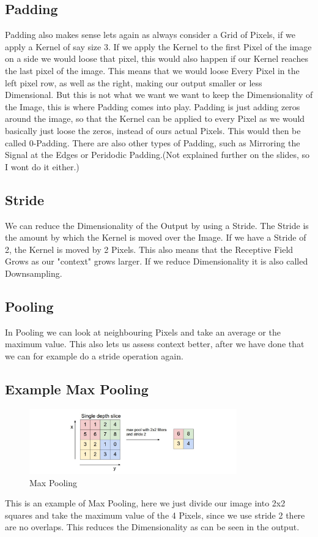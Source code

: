 \documentclass[a4paper]{article}
\begin{document}
\subsection{Padding}
Padding also makes sense lets again as always consider a Grid of Pixels, if we apply a Kernel of say size 3. If we apply the Kernel to the first Pixel of the image on a side we would loose that pixel, this would also happen if our Kernel reaches the last pixel of the image. This means that we would loose Every Pixel in the left pixel row, as well as the right, making our output smaller or less Dimensional. 
But this is not what we want we want to keep the Dimensionality of the Image, this is where Padding comes into play. Padding is just adding zeros around the image, so that the Kernel can be applied to every Pixel as we would basically just loose the zeros, instead of ours actual Pixels. This would then be called 0-Padding. There are also other types of Padding, such as Mirroring the Signal at the Edges or Peridodic Padding.(Not explained further on the slides, so I wont do it either.)

\subsection{Stride}
We can reduce the Dimensionality of the Output by using a Stride. The Stride is the amount by which the Kernel is moved over the Image. If we have a Stride of 2, the Kernel is moved by 2 Pixels. This also means that the Receptive Field Grows as our "context" grows larger. If we reduce Dimensionality it is also called Downsampling. 
\subsection{Pooling} 
In Pooling we can look at neighbouring Pixels and take an average or the maximum value. This also lets us assess context better, after we have done that we can for example do a stride operation again.
\newpage
\subsection{Example Max Pooling}
\begin{figure}[h]
    \centering
    \includegraphics[width=0.8\textwidth]{images/maxpooling.png}
    \caption{Max Pooling}
    \label{fig:Max Pooling}
\end{figure}
This is an example of Max Pooling, here we just divide our image into 2x2 squares and take the maximum value of the 4 Pixels, since we use stride 2 there are no overlaps. This reduces the Dimensionality as can be seen in the output. 
\end{document}
